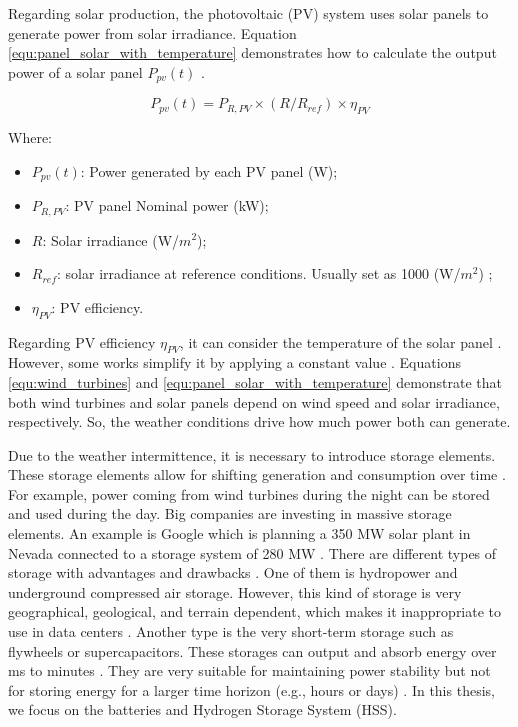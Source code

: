 Regarding solar production, the photovoltaic (PV) system uses solar panels to generate power from solar irradiance. Equation \ref{equ:panel_solar_with_temperature} demonstrates how to calculate the output power of a solar panel $P_{pv}(t)$ \cite{maleki2015optimal, sinha2015review, dong2016optimal}.

\begin{equation}
    \label{equ:panel_solar_with_temperature}
    P_{pv}(t) = P_{R,PV} \times (R / R_{ref}) \times \eta_{PV}
\end{equation}

Where:
\begin{itemize}
    \item $P_{pv}(t)$: Power generated by each PV panel (W);
    \item $P_{R,PV}$: PV panel Nominal power (kW);
    \item $R$: Solar irradiance (W/$m^{2}$);
    \item $R_{ref}$: solar irradiance at reference conditions. Usually set as 1000 (W/$m^{2}$) \cite{dong2016optimal};
    \item $\eta_{PV}$: PV efficiency.
\end{itemize}

Regarding PV efficiency $\eta_{PV}$, it can consider the temperature of the solar panel \cite{sinha2015review, maleki2015optimal}. However, some works simplify it by applying a constant value \cite{dong2016optimal, haddad2019mixed}. Equations \ref{equ:wind_turbines} and \ref{equ:panel_solar_with_temperature} demonstrate that both wind turbines and solar panels depend on wind speed and solar irradiance, respectively. So, the weather conditions drive how much power both can generate. 

Due to the weather intermittence, it is necessary to introduce storage elements. These storage elements allow for shifting generation and consumption over time \cite{rostirolla2022survey}. For example, power coming from wind turbines during the night can be stored and used during the day. Big companies are investing in massive storage elements. An example is Google which is planning a 350 MW solar plant in Nevada connected to a storage system of 280 MW \cite{branscombe2020google}. There are different types of storage with advantages and drawbacks \cite{wang2012energy}. One of them is hydropower and underground compressed air storage. However, this kind of storage is very geographical, geological, and terrain dependent, which makes it inappropriate to use in data centers \cite{rostirolla2022survey}. Another type is the very short-term storage such as flywheels or supercapacitors. These storages can output and absorb energy over ms to minutes \cite{wang2012energy}. They are very suitable for maintaining power stability but not for storing energy for a larger time horizon (e.g., hours or days) \cite{rostirolla2022survey}. In this thesis, we focus on the batteries and Hydrogen Storage System (HSS).

